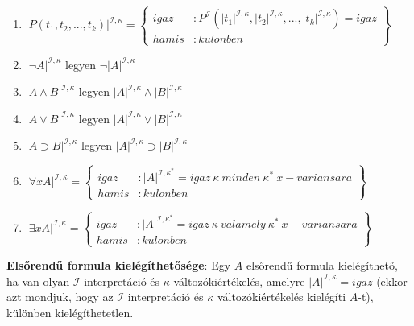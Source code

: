 \documentclass[margin=0px]{article}
\begin{document}
\begin{enumerate}
    \item	$|P(t_{1}, t_{2}, ..., t_{k})|^{\mathcal{I},\kappa} = \left\{
              \begin{array}{lr}
                  igaz  & : P^{\mathcal{I}}(|t_{1}|^{\mathcal{I},\kappa}, |t_{2}|^{\mathcal{I},\kappa}, ..., |t_{k}|^{\mathcal{I},\kappa}) = igaz \\
                  hamis & : kulonben
              \end{array}
              \right\}$

    \item	$|\neg A|^{\mathcal{I},\kappa}$ legyen $\neg |A|^{\mathcal{I},\kappa}$

    \item	$|A \wedge B|^{\mathcal{I},\kappa}$ legyen $|A|^{\mathcal{I},\kappa} \wedge |B|^{\mathcal{I},\kappa}$

    \item	$|A \vee B|^{\mathcal{I},\kappa}$ legyen $|A|^{\mathcal{I},\kappa} \vee |B|^{\mathcal{I},\kappa}$

    \item	$|A \supset B|^{\mathcal{I},\kappa}$ legyen $|A|^{\mathcal{I},\kappa} \supset |B|^{\mathcal{I},\kappa}$

    \item	$|\forall x A|^{\mathcal{I},\kappa} = \left\{
              \begin{array}{lr}
                  igaz  & : |A|^{\mathcal{I},\kappa^{*}} = igaz \ \kappa \ minden \ \kappa^{*} \ x-variansara \\
                  hamis & : kulonben
              \end{array}
              \right\}$

    \item	$|\exists x A|^{\mathcal{I},\kappa} = \left\{
              \begin{array}{lr}
                  igaz  & : |A|^{\mathcal{I},\kappa^{*}} = igaz \ \kappa \ valamely \ \kappa^{*} \ x-variansara \\
                  hamis & : kulonben
              \end{array}
              \right\}$

\end{enumerate}

\noindent \textbf{Elsőrendű formula kielégíthetősége}: Egy $A$ elsőrendű formula kielégíthető, ha van
olyan $\mathcal{I}$ interpretáció és $\kappa$ változókiértékelés, amelyre $|A|^{\mathcal{I},\kappa} = igaz$
(ekkor azt mondjuk, hogy az $\mathcal{I}$ interpretáció és $\kappa$ változókiértékelés kielégíti $A$-t),
különben kielégíthetetlen.
\end{document}
